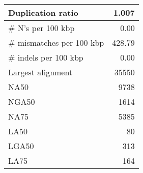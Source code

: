 \documentclass[12pt,a4paper]{article}
\begin{document}
\begin{table}[ht]
\begin{center}
\begin{tabular}{|l*{1}{|r}|}
Duplication ratio & 1.007 \\ \hline
\# N's per 100 kbp & 0.00 \\ \hline
\# mismatches per 100 kbp & 428.79 \\ \hline
\# indels per 100 kbp & 0.00 \\ \hline
Largest alignment & 35550 \\ \hline
NA50 & 9738 \\ \hline
NGA50 & 1614 \\ \hline
NA75 & 5385 \\ \hline
LA50 & 80 \\ \hline
LGA50 & 313 \\ \hline
LA75 & 164 \\ \hline
\end{tabular}
\end{center}
\end{table}
\end{document}
